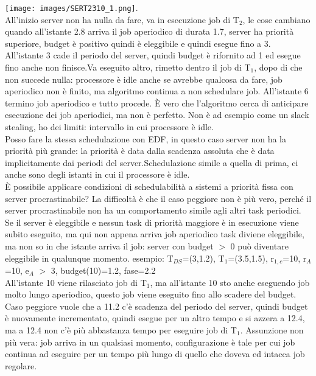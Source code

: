 \documentclass[18px]{article}
\begin{document}
\texttt{[image: images/SERT2310\_1.png]}.\\ All'inizio server non ha nulla da fare, va in esecuzione job di T$_{2}$, le cose cambiano quando all'istante 2.8 arriva il job aperiodico di durata 1.7, server ha priorità superiore, budget è positivo quindi è eleggibile e quindi esegue fino a 3. All'istante 3 cade il periodo del server, quindi budget è rifornito ad 1 ed esegue fino anche non finisce.Va eseguito altro, rimetto dentro il job di T$_{1}$, dopo di che non succede nulla: processore è idle anche se avrebbe qualcosa da fare, job aperiodico non è finito, ma algoritmo continua a non schedulare job. All'istante 6 termino job aperiodico e tutto procede. È vero che l'algoritmo cerca di anticipare esecuzione dei job aperiodici, ma non è perfetto. Non è ad esempio come un slack stealing, ho dei limiti: intervallo in cui processore è idle.\\ Posso fare la stessa schedulazione con EDF, in questo caso server non ha la priorità più grande: la priorità è data dalla scadenza assoluta che è data implicitamente dai periodi del server.Schedulazione simile a quella di prima, ci anche sono degli istanti in cui il processore è idle.\\ È possibile applicare condizioni di schedulabilità a sistemi a priorità fissa con server procrastinabile? La difficoltà è che il caso peggiore non è più vero, perché il server procrastinabile non ha un comportamento simile agli altri task periodici. Se il server è eleggibile e nessun task di priorità maggiore è in esecuzione viene subito eseguito, ma qui non appena arriva job aperiodico task diviene eleggibile, ma non so in che istante arriva il job: server con budget $>$ 0 può diventare eleggibile in qualunque momento. esempio: T$_{DS}$=(3,1.2), T$_{1}$=(3.5,1.5), r$_{1,c}$=10, r$_{A}$=10, e$_{A}$ $>$ 3, budget(10)=1.2, fase=2.2\\ All'istante 10 viene rilasciato job di T$_{1}$, ma all'istante 10 sto anche eseguendo job molto lungo aperiodico, questo job viene eseguito fino allo scadere del budget. Caso peggiore vuole che a 11.2 c'è scadenza del periodo del server, quindi budget è nuovamente incrementato, quindi esegue per un altro tempo e si azzera a 12.4, ma a 12.4 non c'è più abbastanza tempo per eseguire job di T$_{1}$. Assunzione non più vera: job arriva in un qualsiasi momento, configurazione è tale per cui job continua ad eseguire per un tempo più lungo di quello che doveva ed intacca job regolare.
\end{document}
